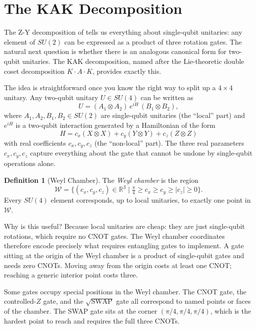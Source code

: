 \documentclass[12pt, a4paper, oneside]{report}
\theoremstyle{plain}
\theoremstyle{definition}
\newtheorem{definition}[theorem]{Definition}
\theoremstyle{remark}
\newcommand{\RR}{\mathbb{R}}
\begin{document}

\section{The KAK Decomposition}

The Z-Y decomposition of  tells us everything about single-qubit unitaries: any
element of $SU(2)$ can be expressed as a product of three rotation gates. The natural next
question is whether there is an analogous canonical form for two-qubit unitaries. The KAK
decomposition, named after the Lie-theoretic double coset decomposition $K\!\cdot\!A\!\cdot\!K$,
provides exactly this.

The idea is straightforward once you know the right way to split up a $4 \times 4$ unitary.
Any two-qubit unitary $U \in SU(4)$ can be written as
\[
  U = (A_1 \otimes A_2)\, e^{i H}\, (B_1 \otimes B_2),
\]
where $A_1, A_2, B_1, B_2 \in SU(2)$ are single-qubit unitaries (the ``local'' part) and
$e^{iH}$ is a two-qubit interaction generated by a Hamiltonian of the form
\[
  H = c_x (X \otimes X) + c_y (Y \otimes Y) + c_z (Z \otimes Z)
\]
with real coefficients $c_x, c_y, c_z$ (the ``non-local'' part). The three real parameters
$c_x, c_y, c_z$ capture everything about the gate that cannot be undone by single-qubit
operations alone.

\begin{definition}[Weyl Chamber]
The \emph{Weyl chamber} is the region
\[
  \mathcal{W} = \bigl\{(c_x, c_y, c_z) \in \RR^3 \;\big|\;
  \tfrac{\pi}{4} \geq c_x \geq c_y \geq |c_z| \geq 0\bigr\}.
\]
Every $SU(4)$ element corresponds, up to local unitaries, to exactly one point in
$\mathcal{W}$.
\end{definition}

Why is this useful? Because local unitaries are cheap: they are just single-qubit rotations,
which require no CNOT gates. The Weyl chamber coordinates therefore encode precisely what
requires entangling gates to implement. A gate sitting at the origin of the Weyl chamber is a
product of single-qubit gates and needs zero CNOTs. Moving away from the origin costs at
least one CNOT; reaching a generic interior point costs three.

Some gates occupy special positions in the Weyl chamber. The CNOT gate, the controlled-$Z$
gate, and the $\sqrt{\mathrm{SWAP}}$ gate all correspond to named points or faces of the
chamber. The SWAP gate sits at the corner $({\pi}/{4}, {\pi}/{4}, {\pi}/{4})$, which is
the hardest point to reach and requires the full three CNOTs.
\end{document}
